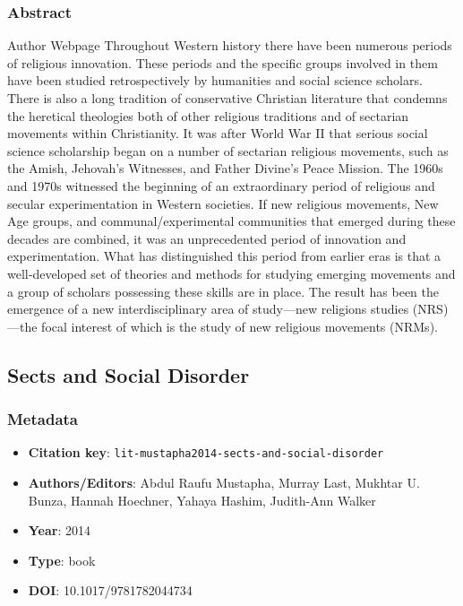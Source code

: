 \subsubsection*{Abstract}
Author Webpage Throughout Western history there have been numerous periods of religious innovation. These periods and the specific groups involved in them have been studied retrospectively by humanities and social science scholars. There is also a long tradition of conservative Christian literature that condemns the heretical theologies both of other religious traditions and of sectarian movements within Christianity. It was after World War II that serious social science scholarship began on a number of sectarian religious movements, such as the Amish, Jehovah's Witnesses, and Father Divine's Peace Mission. The 1960s and 1970s witnessed the beginning of an extraordinary period of religious and secular experimentation in Western societies. If new religious movements, New Age groups, and communal/experimental communities that emerged during these decades are combined, it was an unprecedented period of innovation and experimentation. What has distinguished this period from earlier eras is that a well‐developed set of theories and methods for studying emerging movements and a group of scholars possessing these skills are in place. The result has been the emergence of a new interdisciplinary area of study—new religions studies (NRS)—the focal interest of which is the study of new religious movements (NRMs).

\subsection{Sects and Social Disorder}\label{lit:lit-mustapha2014-sects-and-social-disorder}
\subsubsection*{Metadata}
\begin{itemize}
  \item \textbf{Citation key}: \texttt{lit-mustapha2014-sects-and-social-disorder}
  \item \textbf{Authors/Editors}: Abdul Raufu Mustapha, Murray Last, Mukhtar U. Bunza, Hannah Hoechner, Yahaya Hashim, Judith-Ann Walker
  \item \textbf{Year}: 2014
  \item \textbf{Type}: book
  \item \textbf{DOI}: 10.1017/9781782044734
\end{itemize}
